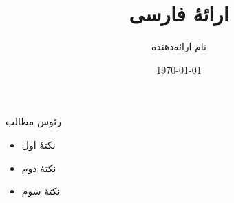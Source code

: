 \documentclass{beamer}
\title{ارائهٔ فارسی}
\author{نام ارائه‌دهنده}
\date{\today}
\begin{document}
\begin{frame}
  \titlepage
\end{frame}

\begin{frame}{رئوس مطالب}
  \begin{itemize}
    \item نکتهٔ اول
    \item نکتهٔ دوم
    \item نکتهٔ سوم
  \end{itemize}
\end{frame}
\end{document}

